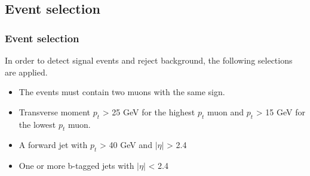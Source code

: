 \documentclass[11pt]{beamer}
\begin{document}
\begin{frame}
\begin{table}
	\label{back}
\end{table} 
\end{frame}


\begin{frame}
\subsection{Event selection}
\frametitle{Event selection}
In order to detect signal events and reject background, the following selections are applied. 
\begin{itemize}
	\item The events must contain two muons with the same sign.
	\item Transverse moment $p_{t}$ > 25 GeV for the highest $p_t$ muon and $p_{t}$ > 15 GeV for the lowest $p_t$ muon.
	\item A forward jet with $p_t$ > 40 GeV and $|\eta|$ > 2.4
	\item One or more b-tagged jets with $|\eta|$ < 2.4
\end{itemize}
\end{frame}
\end{document}

